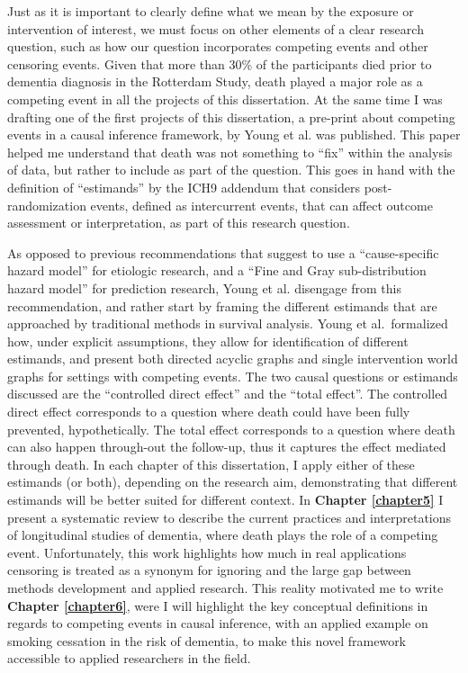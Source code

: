 \documentclass[
]{book}
\begin{document}
Just as it is important to clearly define what we mean by the exposure or intervention of interest, we must focus on other elements of a clear research question, such as how our question incorporates competing events and other censoring events. Given that more than 30\% of the participants died prior to dementia diagnosis in the Rotterdam Study, death played a major role as a competing event in all the projects of this dissertation. At the same time I was drafting one of the first projects of this dissertation, a pre-print about competing events in a causal inference framework, by Young et al.\autocite{young2020} was published. This paper helped me understand that death was not something to ``fix'' within the analysis of data, but rather to include as part of the question. This goes in hand with the definition of ``estimands'' by the ICH9 addendum\autocite{ich9} that considers post-randomization events, defined as intercurrent events, that can affect outcome assessment or interpretation, as part of this research question.

As opposed to previous recommendations that suggest to use a ``cause-specific hazard model'' for etiologic research, and a ``Fine and Gray sub-distribution hazard model'' for prediction research\autocite{lau2009}, Young et al.\autocite{young2020} disengage from this recommendation, and rather start by framing the different estimands that are approached by traditional methods in survival analysis. Young et al.~formalized how, under explicit assumptions, they allow for identification of different estimands, and present both directed acyclic graphs and single intervention world graphs for settings with competing events. The two causal questions or estimands discussed are the ``controlled direct effect'' and the ``total effect''. The controlled direct effect corresponds to a question where death could have been fully prevented, hypothetically. The total effect corresponds to a question where death can also happen through-out the follow-up, thus it captures the effect mediated through death. In each chapter of this dissertation, I apply either of these estimands (or both), depending on the research aim, demonstrating that different estimands will be better suited for different context. In \textbf{Chapter \ref{chapter5}} I present a systematic review to describe the current practices and interpretations of longitudinal studies of dementia, where death plays the role of a competing event. Unfortunately, this work highlights how much in real applications censoring is treated as a synonym for ignoring and the large gap between methods development and applied research. This reality motivated me to write \textbf{Chapter \ref{chapter6}}, were I will highlight the key conceptual definitions in regards to competing events in causal inference, with an applied example on smoking cessation in the risk of dementia, to make this novel framework accessible to applied researchers in the field.
\end{document}
